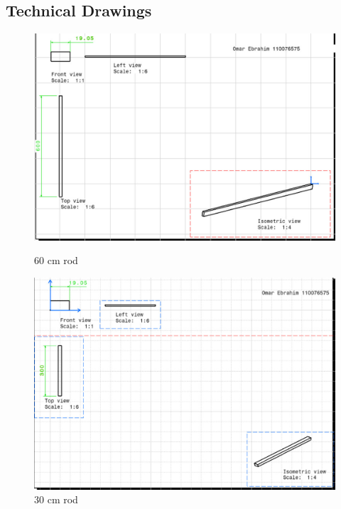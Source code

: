 \documentclass[12pt, titlepage]{article}
\begin{document}
    \subsection{Technical Drawings}
    \begin{figure}[b]
    \begin{minipage}[t]{0.45\textwidth}
        \begin{flushleft}
            \includegraphics[width=\textwidth]{figures/Drawing1.jpeg}
        \end{flushleft}
        \caption{60 cm rod\label{60rod}}
    \end{minipage}
    \hfill
    \begin{minipage}[t]{0.45\textwidth}
        \begin{flushright}
            \includegraphics[width=\textwidth]{figures/Drawing2.jpeg}
        \end{flushright}
        \caption{30 cm rod\label{30rod}}
    \end{minipage}
    \end{figure}
\end{document}
